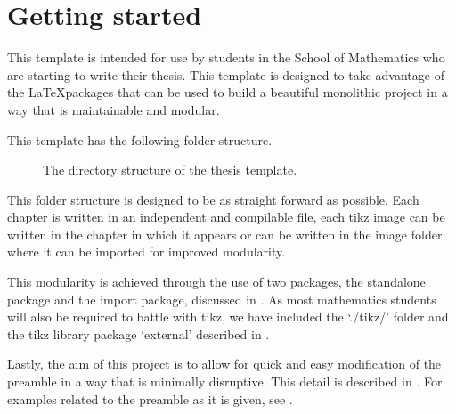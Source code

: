 \documentclass[float=false, crop=false, class=report, a4, 12pt, onesided]{standalone}
\begin{document}
\ifstandalone
	\setcounter{chapter}{0}
\fi

\chapter{Getting started}

This template is intended for use by students in the School of Mathematics who
are starting to write their thesis. This template is designed to take advantage
of the \LaTeX packages that can be used to build a beautiful monolithic project
in a way that is maintainable and modular.

This template has the following folder structure.

\begin{figure}[ht]
	\centering
	\caption{The directory structure of the thesis template.\label{fig:dirstruct}}
\end{figure}

This folder structure is designed to be as straight forward as possible. Each
chapter is written in an independent and compilable file, each tikz image can
be written in the chapter in which it appears or can be written in the image
folder where it can be imported for improved modularity.

This modularity is achieved through the use of two packages, the standalone
package and the import package, discussed in . As most
mathematics students will also be required to battle with tikz, we have
included the `./tikz/' folder and the tikz library package `external' described
in .

Lastly, the aim of this project is to allow for quick and easy modification of
the preamble in a way that is minimally disruptive. This detail is described in
. For examples related to the preamble as it is given, see
.

\ifstandalone
	
\fi
\end{document}
